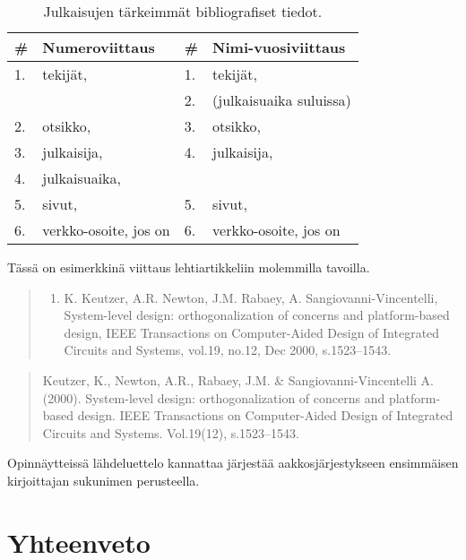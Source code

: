 \documentclass[globalnumbering,centeredcaptions,draftfooter]{tutthesis/tutthesis} %
\begin{document}
\begin{table}[ht!]
\caption{Julkaisujen tärkeimmät bibliografiset tiedot.}
\label{tab:bibliografiset-tiedot}
\begin{tabular}{l l | l l}
\hline
\textbf{\#} & \textbf{Numeroviittaus} & \# & \textbf{Nimi-vuosiviittaus} \\
\hline \hline
1. & tekijät, & 1. & tekijät,\\
& & 2. & (julkaisuaika suluissa) \\
2. & otsikko, & 3. & otsikko, \\
3. & julkaisija, & 4. & julkaisija, \\
4. & julkaisuaika, & \\
5. & sivut, & 5. & sivut, \\
6. & verkko-osoite, jos on & 6. & verkko-osoite, jos on \\
\hline
\end{tabular}
\end{table}

Tässä on esimerkkinä viittaus lehtiartikkeliin molemmilla tavoilla.

\begin{quotation}
\small
\begin{enumerate}
  \renewcommand*\labelenumi{[\theenumi]}
  \setcounter{enumi}{99}
  \item K. Keutzer, A.R. Newton, J.M. Rabaey, A. Sangiovanni-Vincentelli, System-level design: orthogonalization of concerns and platform-based design, IEEE Transactions on Computer-Aided Design of Integrated Circuits and Systems, vol.19, no.12, Dec 2000, s.1523--1543.
\end{enumerate}
\end{quotation}

\begin{quotation}
Keutzer, K., Newton, A.R., Rabaey, J.M. \& Sangiovanni-Vincentelli A. (2000). System-level design: orthogonalization of concerns and platform-based design. IEEE Transactions on Computer-Aided Design of Integrated Circuits and Systems. Vol.19(12), s.1523--1543.
\end{quotation}

Opinnäytteissä lähdeluettelo kannattaa järjestää aakkosjärjestykseen ensimmäisen kirjoittajan sukunimen perusteella.



\chapter{Yhteenveto}
\label{ch:yhteenveto}
\end{document}
